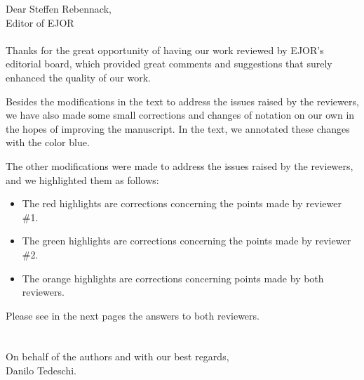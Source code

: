 \documentclass{report}
\begin{document}
	
			
			\noindent Dear Steffen Rebennack,\\ Editor of EJOR
			\\
			\\
			
			Thanks for the great opportunity of having our work reviewed by EJOR's editorial board, which provided great comments and suggestions that surely enhanced the quality of our work. 
			
			Besides the modifications in the text to address the issues raised by the reviewers, we have also made some small corrections and changes of notation on our own in the hopes of improving the manuscript. In the text, we annotated these changes with the color {\color{blue}blue}.
			
			The other modifications were made to address the issues raised by the reviewers, and we highlighted them as follows:
			
			\begin{itemize}
				\item The {\color{Red} red} highlights are corrections concerning the points made by reviewer \#1.
				
				\item The {\color{Green} green} highlights are corrections concerning the points made by reviewer \#2.
				
				\item The {\color{Orange} orange} highlights are corrections concerning points made by both reviewers.
			\end{itemize}
			
			Please see in the next pages the answers to both reviewers.
			\\
			\\
			\\
			On behalf of the authors and with our best regards,\\
			Danilo Tedeschi.
\clearpage
	
	
	\clearpage
	
	
\end{document}
